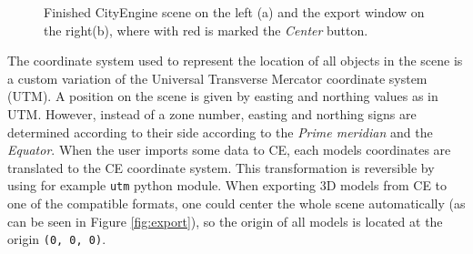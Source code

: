 \begin{figure}[htb]
	\centering
	\caption{Finished CityEngine scene on the left (a) and the export window on the right(b), where with red is marked the \emph{Center} button.}
\end{figure}

The coordinate system used to represent the location of all objects in the scene is a custom variation of the Universal Transverse Mercator coordinate system (UTM). A position on the scene is given by easting and northing values as in UTM. However, instead of a zone number, easting and northing signs are determined according to their side according to the \emph{Prime meridian} and the \emph{Equator}\cite{ceman}. When the user imports some data to CE, each models coordinates are translated to the CE coordinate system. This transformation is reversible by using for example \texttt{utm}\cite{utm} python module. When exporting 3D models from CE to one of the compatible formats, one could center the whole scene automatically (as can be seen in Figure \ref{fig:export}), so the origin of all models is located at the origin \texttt{(0, 0, 0)}.

